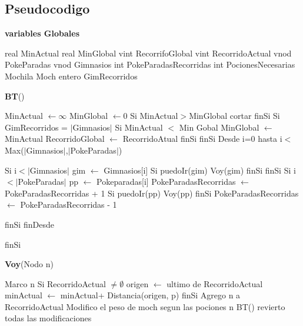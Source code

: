 \documentclass[spanish,12pt]{article}
\begin{document}

\subsection{Pseudocodigo}

\begin{algorithm}[H]{\textbf{variables Globales}}
	\begin{algorithmic}[1]
		\State real MinActual 
		\State real MinGlobal
		\State vint RecorrifoGlobal
		\State vint RecorridoActual
		\State vnod PokeParadas
		\State vnod Gimnasios
		\State int PokeParadasRecorridas
		\State int PocionesNecesarias		
		\State Mochila Moch	
		\State entero GimRecorridos	
	
	\end{algorithmic}
\end{algorithm}

\begin{algorithm}[H]{\textbf{BT}()}
	\begin{algorithmic}[1]
		\State MinActual $\gets \infty$
		\State MinGlobal $\gets 0$
		\State Si  MinActual$>$MinGlobal  
			 \State \quad cortar
		\State finSi
		\State Si GimRecorridos = $|$Gimnasios$|$ 
		\State \quad Si MinActual $<$ Min Gobal
		\State \qquad MinGlobal $\gets$ MinActual
		\State \qquad RecorridoGlobal $\gets$ RecorridoAtual
		\State \quad finSi
		\State finSi
		\State Desde i=0 hasta i$<$Max($|$Gimnasios$|$,$|$PokeParadas$|$)
	
		\State \qquad Si i$< |$Gimnasios$|$
		\State \qquad \quad gim $\gets$ Gimnasios[i]
		\State \qquad \quad Si puedoIr(gim)
		\State \qquad \qquad Voy(gim)
 		\State \qquad finSi	
		\State \quad finSi
		\State \quad Si i $< |$PokeParadas$|$
		\State \quad pp $\gets$ Pokeparadas[i]
		\State \quad PokeParadasRecorridas $\gets$ PokeParadasRecorridas + 1 
		\State \qquad Si puedoIr(pp)
		\State \qquad Voy(pp) 	
		\State \qquad finSi
		\State \quad PokeParadasRecorridas $\gets$ PokeParadasRecorridas - 1 

		\State \quad finSi 
		\State finDesde
  		
		
		
		\State finSi
	\end{algorithmic}
\end{algorithm}

\begin{algorithm}[H]{\textbf{Voy}(Nodo n)}
	\begin{algorithmic}[1]
		\State Marco n
		\State Si RecorridoActual $ \not= \emptyset$
		\State \quad origen $\gets$ ultimo de RecorridoActual
		\State \quad minActual $\gets$ minActual+ Distancia(origen, p)
		\State finSi
		\State Agrego n a RecorridoActual
		\State Modifico el peso de moch segun las pociones n
		\State BT()
		\State revierto todas las modificaciones
	\end{algorithmic}
\end{algorithm}
\end{document}
